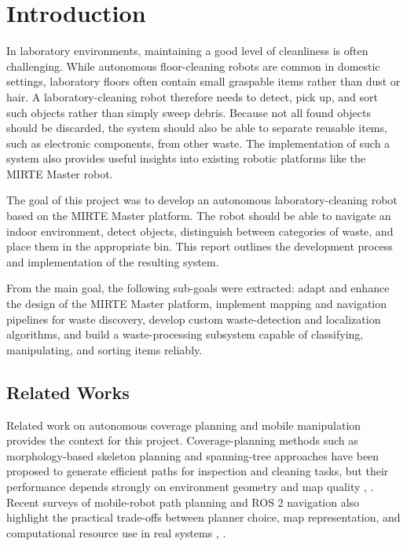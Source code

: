 \section{Introduction}
\label{sec:intro}

In laboratory environments, maintaining a good level of cleanliness is often challenging. While autonomous floor-cleaning robots are common in domestic settings, laboratory floors often contain small graspable items rather than dust or hair. A laboratory-cleaning robot therefore needs to detect, pick up, and sort such objects rather than simply sweep debris. Because not all found objects should be discarded, the system should also be able to separate reusable items, such as electronic components, from other waste. The implementation of such a system also provides useful insights into existing robotic platforms like the MIRTE Master robot.

The goal of this project was to develop an autonomous laboratory-cleaning robot based on the MIRTE Master platform. The robot should be able to navigate an indoor environment, detect objects, distinguish between categories of waste, and place them in the appropriate bin. This report outlines the development process and implementation of the resulting system.

From the main goal, the following sub-goals were extracted: adapt and enhance the design of the MIRTE Master platform, implement mapping and navigation pipelines for waste discovery, develop custom waste-detection and localization algorithms, and build a waste-processing subsystem capable of classifying, manipulating, and sorting items reliably.

\subsection{Related Works}

Related work on autonomous coverage planning and mobile manipulation provides the context for this project. Coverage-planning methods such as morphology-based skeleton planning and spanning-tree approaches have been proposed to generate efficient paths for inspection and cleaning tasks, but their performance depends strongly on environment geometry and map quality \cite{skeleton}, \cite{SpanningTree2001}. Recent surveys of mobile-robot path planning and ROS 2 navigation also highlight the practical trade-offs between planner choice, map representation, and computational resource use in real systems \cite{s21237898}, \cite{macenski2023survey}.

